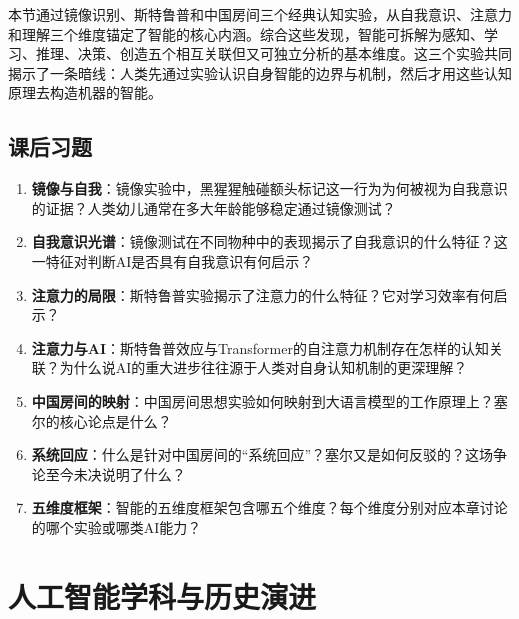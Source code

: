本节通过镜像识别、斯特鲁普和中国房间三个经典认知实验，从自我意识、注意力和理解三个维度锚定了智能的核心内涵。综合这些发现，智能可拆解为感知、学习、推理、决策、创造五个相互关联但又可独立分析的基本维度。这三个实验共同揭示了一条暗线：人类先通过实验认识自身智能的边界与机制，然后才用这些认知原理去构造机器的智能。

\bigskip
\subsection*{课后习题}
\begin{enumerate}
\setlength{\itemsep}{6pt}

\item \textbf{镜像与自我}：镜像实验中，黑猩猩触碰额头标记这一行为为何被视为自我意识的证据？人类幼儿通常在多大年龄能够稳定通过镜像测试？

\item \textbf{自我意识光谱}：镜像测试在不同物种中的表现揭示了自我意识的什么特征？这一特征对判断AI是否具有自我意识有何启示？

\item \textbf{注意力的局限}：斯特鲁普实验揭示了注意力的什么特征？它对学习效率有何启示？

\item \textbf{注意力与AI}：斯特鲁普效应与Transformer的自注意力机制存在怎样的认知关联？为什么说AI的重大进步往往源于人类对自身认知机制的更深理解？

\item \textbf{中国房间的映射}：中国房间思想实验如何映射到大语言模型的工作原理上？塞尔的核心论点是什么？

\item \textbf{系统回应}：什么是针对中国房间的``系统回应''？塞尔又是如何反驳的？这场争论至今未决说明了什么？

\item \textbf{五维度框架}：智能的五维度框架包含哪五个维度？每个维度分别对应本章讨论的哪个实验或哪类AI能力？

\end{enumerate}

\newpage

\section{人工智能学科与历史演进}

